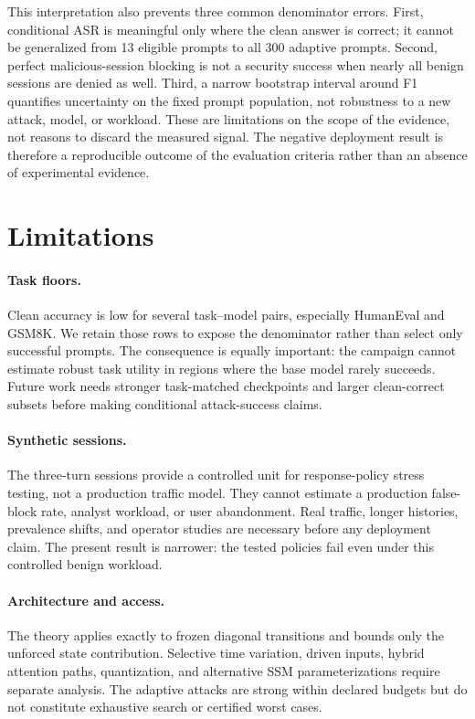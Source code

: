 \documentclass[sigconf]{acmart}
\begin{document}
This interpretation also prevents three common denominator errors. First,
conditional ASR is meaningful only where the clean answer is correct; it cannot
be generalized from 13 eligible prompts to all 300 adaptive prompts. Second,
perfect malicious-session blocking is not a security success when nearly all
benign sessions are denied as well. Third, a narrow bootstrap interval around
F1 quantifies uncertainty on the fixed prompt population, not robustness to a
new attack, model, or workload. These are limitations on the scope of the
evidence, not reasons to discard the measured signal. The negative deployment
result is therefore a reproducible outcome of the evaluation criteria rather
than an absence of experimental evidence.

\section{Limitations}
\paragraph{Task floors.}
Clean accuracy is low for several task--model pairs, especially HumanEval and
GSM8K. We retain those rows to expose the denominator rather than select only
successful prompts. The consequence is equally important: the campaign cannot
estimate robust task utility in regions where the base model rarely succeeds.
Future work needs stronger task-matched checkpoints and larger clean-correct
subsets before making conditional attack-success claims.

\paragraph{Synthetic sessions.}
The three-turn sessions provide a controlled unit for response-policy stress
testing, not a production traffic model. They cannot estimate a production
false-block rate, analyst workload, or user abandonment. Real traffic, longer
histories, prevalence shifts, and operator studies are necessary before any
deployment claim. The present result is narrower: the tested policies fail even
under this controlled benign workload.

\paragraph{Architecture and access.}
The theory applies exactly to frozen diagonal transitions and bounds only the
unforced state contribution. Selective time variation, driven inputs, hybrid
attention paths, quantization, and alternative SSM parameterizations require
separate analysis. The adaptive attacks are strong within declared budgets but
do not constitute exhaustive search or certified worst cases.
\end{document}
